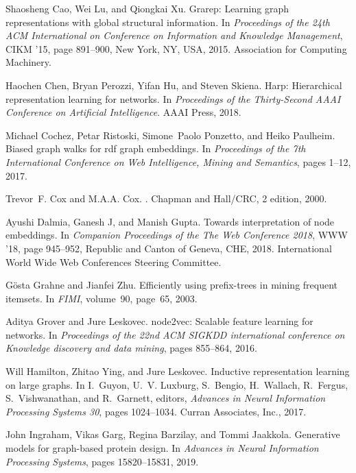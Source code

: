 \documentclass{IEEEtran}
\begin{document}
\begin{thebibliography}{00}
Shaosheng Cao, Wei Lu, and Qiongkai Xu.
\newblock Grarep: Learning graph representations with global structural
  information.
\newblock In {\em Proceedings of the 24th ACM International on Conference on
  Information and Knowledge Management}, CIKM '15, page 891–900, New York,
  NY, USA, 2015. Association for Computing Machinery.

Haochen Chen, Bryan Perozzi, Yifan Hu, and Steven Skiena.
\newblock Harp: Hierarchical representation learning for networks.
\newblock In {\em Proceedings of the Thirty-Second AAAI Conference on
  Artificial Intelligence}. AAAI Press, 2018.

Michael Cochez, Petar Ristoski, Simone~Paolo Ponzetto, and Heiko Paulheim.
\newblock Biased graph walks for rdf graph embeddings.
\newblock In {\em Proceedings of the 7th International Conference on Web
  Intelligence, Mining and Semantics}, pages 1--12, 2017.

Trevor~F. Cox and M.A.A. Cox.
.
\newblock Chapman and Hall/CRC, 2 edition, 2000.

Ayushi Dalmia, Ganesh J, and Manish Gupta.
\newblock Towards interpretation of node embeddings.
\newblock In {\em Companion Proceedings of the The Web Conference 2018}, WWW
  '18, page 945–952, Republic and Canton of Geneva, CHE, 2018. International
  World Wide Web Conferences Steering Committee.

G{\"o}sta Grahne and Jianfei Zhu.
\newblock Efficiently using prefix-trees in mining frequent itemsets.
\newblock In {\em FIMI}, volume~90, page~65, 2003.

Aditya Grover and Jure Leskovec.
\newblock node2vec: Scalable feature learning for networks.
\newblock In {\em Proceedings of the 22nd ACM SIGKDD international conference
  on Knowledge discovery and data mining}, pages 855--864, 2016.

Will Hamilton, Zhitao Ying, and Jure Leskovec.
\newblock Inductive representation learning on large graphs.
\newblock In I.~Guyon, U.~V. Luxburg, S.~Bengio, H.~Wallach, R.~Fergus,
  S.~Vishwanathan, and R.~Garnett, editors, {\em Advances in Neural Information
  Processing Systems 30}, pages 1024--1034. Curran Associates, Inc., 2017.

John Ingraham, Vikas Garg, Regina Barzilay, and Tommi Jaakkola.
\newblock Generative models for graph-based protein design.
\newblock In {\em Advances in Neural Information Processing Systems}, pages
  15820--15831, 2019.


\end{thebibliography}
\end{document}
